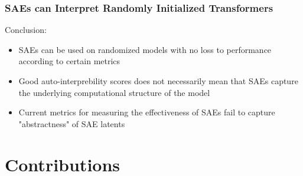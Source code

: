 \documentclass{beamer}
\begin{document}
\begin{frame}
    \frametitle{SAEs can Interpret Randomly Initialized Transformers}
    Conclusion:
    \begin{itemize}
        \item SAEs can be used on randomized models with no loss to performance according to certain metrics
        \item Good auto-interprebility scores does not necessarily mean that SAEs capture the underlying computational structure of the model
        \item Current metrics for measuring the effectiveness of SAEs fail to capture "abstractness" of SAE latents
    \end{itemize} 
\end{frame}

\section{Contributions}
\end{document}
